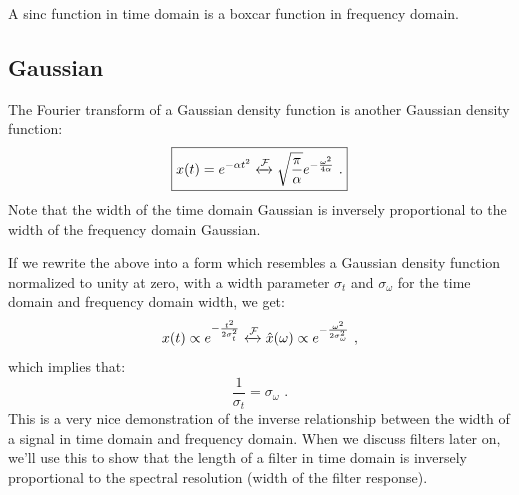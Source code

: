 \begin{marginfigure}
\begin{center}

\end{center}
\caption{A sinc function in time domain is a boxcar function in frequency domain.}
\end{marginfigure}

\subsection{Gaussian}
The Fourier transform of a Gaussian density function is another Gaussian density function:
\begin{equation}
\boxed{x(t) = e^{-\alpha t^2} \xleftrightarrow{\mathcal{F}} \sqrt{\frac{\pi}{\alpha}} e^{-\frac{\omega^2}{4\alpha}}\,\,.}
\end{equation} 
Note that the width of the time domain Gaussian is inversely proportional to the width of the frequency domain Gaussian.

If we rewrite the above into a form which resembles a Gaussian density function normalized to unity at zero, with a width parameter $\sigma_t$ and $\sigma_\omega$ for the time domain and frequency domain width, we get:
\begin{equation}
x(t) \propto e^{-\frac{t^2}{2\sigma_t^2}} \xleftrightarrow{\mathcal{F}} \hat{x}(\omega) \propto e^{-\frac{\omega^2}{2\sigma_\omega^2}}\,\,,
\end{equation}
which implies that:
\begin{equation}
\frac{1}{\sigma_t} = \sigma_\omega\,\,.
\end{equation}%
This is a very nice demonstration of the inverse relationship between the width of a signal in time domain and frequency domain. When we discuss filters later on, we'll use this to show that the length of a filter in time domain is inversely proportional to the spectral resolution (width of the filter response).

